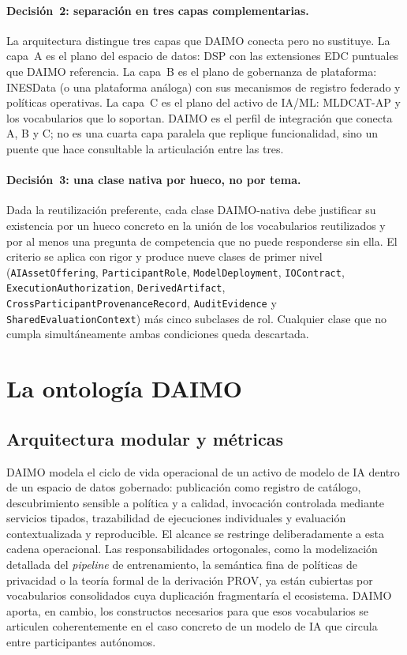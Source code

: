 \documentclass[Afour,sagev,times]{sagej}
\newcommand{\code}[1]{\texttt{#1}}
\begin{document}
\paragraph{Decisión~2: separación en tres capas complementarias.} La arquitectura distingue tres capas que DAIMO conecta pero no sustituye. La capa~A es el plano del espacio de datos: DSP con las extensiones EDC puntuales que DAIMO referencia. La capa~B es el plano de gobernanza de plataforma: INESData (o una plataforma análoga) con sus mecanismos de registro federado y políticas operativas. La capa~C es el plano del activo de IA/ML: MLDCAT-AP y los vocabularios que lo soportan. DAIMO es el perfil de integración que conecta A, B y C; no es una cuarta capa paralela que replique funcionalidad, sino un puente que hace consultable la articulación entre las tres.

\paragraph{Decisión~3: una clase nativa por hueco, no por tema.} Dada la reutilización preferente, cada clase DAIMO-nativa debe justificar su existencia por un hueco concreto en la unión de los vocabularios reutilizados y por al menos una pregunta de competencia que no puede responderse sin ella. El criterio se aplica con rigor y produce nueve clases de primer nivel (\code{AIAssetOffering}, \code{ParticipantRole}, \code{ModelDeployment}, \code{IOContract}, \code{ExecutionAuthorization}, \code{DerivedArtifact}, \code{CrossParticipantProvenanceRecord}, \code{AuditEvidence} y \code{SharedEvaluationContext}) más cinco subclases de rol. Cualquier clase que no cumpla simultáneamente ambas condiciones queda descartada.

\section{La ontología DAIMO}\label{sec:ontology}

\subsection{Arquitectura modular y métricas}\label{sec:scope}

DAIMO modela el ciclo de vida operacional de un activo de modelo de IA dentro de un espacio de datos gobernado: publicación como registro de catálogo, descubrimiento sensible a política y a calidad, invocación controlada mediante servicios tipados, trazabilidad de ejecuciones individuales y evaluación contextualizada y reproducible. El alcance se restringe deliberadamente a esta cadena operacional. Las responsabilidades ortogonales, como la modelización detallada del \emph{pipeline} de entrenamiento, la semántica fina de políticas de privacidad o la teoría formal de la derivación PROV, ya están cubiertas por vocabularios consolidados cuya duplicación fragmentaría el ecosistema. DAIMO aporta, en cambio, los constructos necesarios para que esos vocabularios se articulen coherentemente en el caso concreto de un modelo de IA que circula entre participantes autónomos.
\end{document}
